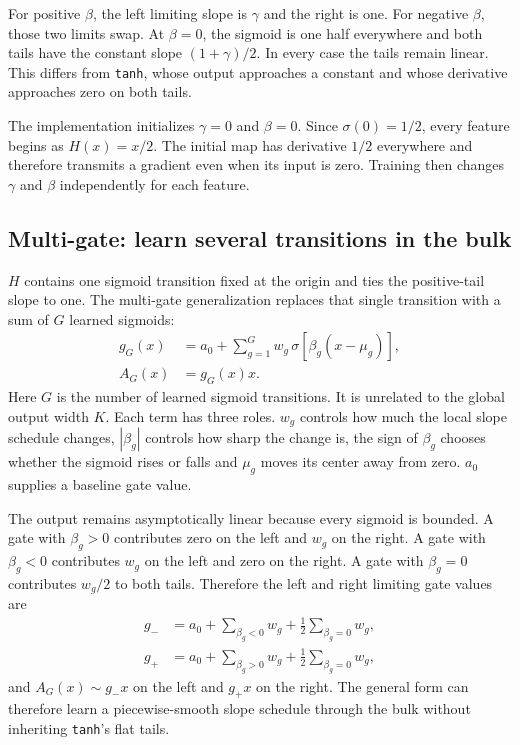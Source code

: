 \documentclass[10pt,aps,prd,twocolumn,nofootinbib]{revtex4-2}
\newcommand{\code}[1]{\texttt{#1}}
\begin{document}
For positive \(\beta\), the left limiting slope is $\gamma$ and the right is
one.  For negative \(\beta\), those two limits swap.  At \(\beta=0\), the
sigmoid is one half everywhere and both tails have the constant slope
$(1+\gamma)/2$.  In every case the tails remain linear.  This differs from
\code{tanh}, whose output approaches a constant and whose derivative
approaches zero on both tails.

The implementation initializes \(\gamma=0\) and \(\beta=0\).  Since
\(\sigma(0)=1/2\), every feature begins as \(H(x)=x/2\).  The initial map has
derivative \(1/2\) everywhere and therefore transmits a gradient even when
its input is zero.  Training then changes \(\gamma\) and \(\beta\)
independently for each feature.

\subsection{Multi-gate: learn several transitions in the bulk}

\(H\) contains one sigmoid transition fixed at the origin and ties the
positive-tail slope to one.  The multi-gate generalization replaces that
single transition with a sum of \(G\) learned sigmoids:
\begin{align}
 g_G(x)&=a_0+\sum_{g=1}^{G}
 w_g\,\sigma\!\left[\beta_g(x-\mu_g)\right],\nonumber\\
 A_G(x)&=g_G(x)x.
 \label{eq:multigate}
\end{align}
Here $G$ is the number of learned sigmoid transitions.  It is unrelated to the
global output width $K$.  Each term has three roles.  \(w_g\) controls how much
the local slope schedule changes, $|\beta_g|$ controls how sharp the change is,
the sign of $\beta_g$ chooses whether the sigmoid rises or falls and \(\mu_g\)
moves its center away from zero.  \(a_0\) supplies a baseline gate value.

The output remains asymptotically linear because every sigmoid is bounded.
A gate with $\beta_g>0$ contributes zero on the left and $w_g$ on the right.
A gate with $\beta_g<0$ contributes $w_g$ on the left and zero on the right.
A gate with $\beta_g=0$ contributes $w_g/2$ to both tails.  Therefore the
left and right limiting gate values are
\begin{align*}
 g_-&=a_0+\sum_{\beta_g<0}w_g
             +\frac12\sum_{\beta_g=0}w_g,\\
 g_+&=a_0+\sum_{\beta_g>0}w_g
             +\frac12\sum_{\beta_g=0}w_g,
\end{align*}
and $A_G(x)\sim g_-x$ on the left and $g_+x$ on the right.
The general form can therefore learn a piecewise-smooth slope schedule through
the bulk without inheriting \code{tanh}'s flat tails.
\end{document}
